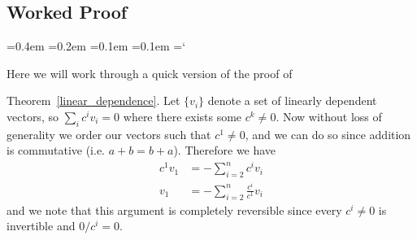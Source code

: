 
\subsection*{Worked Proof}

{\ttfamily
{}\font=0.4em
\font=0.2em
\font=0.1em
\font=0.1em
\hyphenchar\font=`\-

\hypertarget{scripts_linear_independence_thm}{Here we will work through a quick version of the proof of} Theorem~\ref{linear_dependence}. Let $\{ v_i \}$ denote a set of linearly dependent vectors, so $\sum_i c^i v_i = 0$ where there exists some $c^k \neq 0$. Now without loss of generality we order our vectors such that $c^1 \neq 0$, and we can do so since addition is commutative (i.e. $a + b = b + a$). Therefore we have
\begin{align*}
c^1 v_1 & = -\sum_{i=2}^n c^i v_i
\\ v_1 & = -\sum_{i=2}^n \frac{c^i}{c^1} v_i
\end{align*}
and we note that this argument is completely reversible since every $c^i \neq 0$ is invertible and $0 / c^i = 0$.

} %

